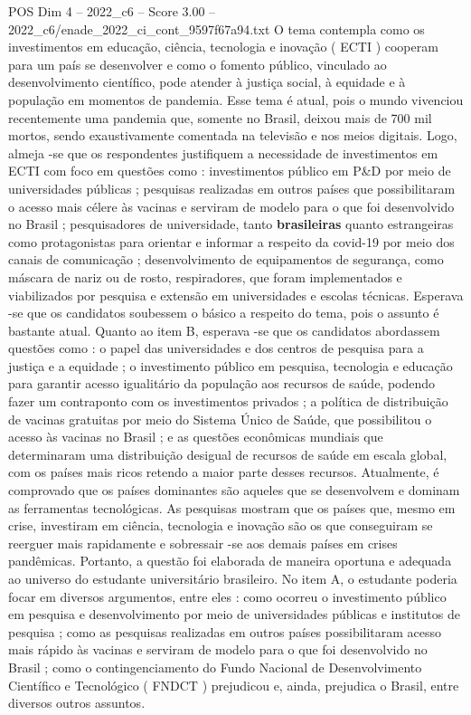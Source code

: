 \begin{textsample}{POS Dim 4 – 2022\_c6 – Score 3.00 – 2022\_c6/enade\_2022\_ci\_cont\_9597f67a94.txt}
O tema contempla como os investimentos em educação, ciência, tecnologia e inovação ( ECTI ) cooperam para um país se desenvolver e como o fomento público, vinculado ao desenvolvimento científico, pode atender à justiça social, à equidade e à população em momentos de pandemia.
Esse tema é atual, pois o mundo vivenciou recentemente uma pandemia que, somente no Brasil, deixou mais de 700 mil mortos, sendo exaustivamente comentada na televisão e nos meios digitais.
Logo, almeja -se que os respondentes justifiquem a necessidade de investimentos em ECTI com foco em questões como : investimentos público em P\&D por meio de universidades públicas ; pesquisas realizadas em outros países que possibilitaram o acesso mais célere às vacinas e serviram de modelo para o que foi desenvolvido no Brasil ; pesquisadores de universidade, tanto \textbf{brasileiras} quanto estrangeiras como protagonistas para orientar e informar a respeito da covid-19 por meio dos canais de comunicação ; desenvolvimento de equipamentos de segurança, como máscara de nariz ou de rosto, respiradores, que foram implementados e viabilizados por pesquisa e extensão em universidades e escolas técnicas.
Esperava -se que os candidatos soubessem o básico a respeito do tema, pois o assunto é bastante atual.
Quanto ao item B, esperava -se que os candidatos abordassem questões como : o papel das universidades e dos centros de pesquisa para a justiça e a equidade ; o investimento público em pesquisa, tecnologia e educação para garantir acesso igualitário da população aos recursos de saúde, podendo fazer um contraponto com os investimentos privados ; a política de distribuição de vacinas gratuitas por meio do Sistema Único de Saúde, que possibilitou o acesso às vacinas no Brasil ; e as questões econômicas mundiais que determinaram uma distribuição desigual de recursos de saúde em escala global, com os países mais ricos retendo a maior parte desses recursos.
Atualmente, é comprovado que os países dominantes são aqueles que se desenvolvem e dominam as ferramentas tecnológicas.
As pesquisas mostram que os países que, mesmo em crise, investiram em ciência, tecnologia e inovação são os que conseguiram se reerguer mais rapidamente e sobressair -se aos demais países em crises pandêmicas.
Portanto, a questão foi elaborada de maneira oportuna e adequada ao universo do estudante universitário brasileiro.
No item A, o estudante poderia focar em diversos argumentos, entre eles : como ocorreu o investimento público em pesquisa e desenvolvimento por meio de universidades públicas e institutos de pesquisa ; como as pesquisas realizadas em outros países possibilitaram acesso mais rápido às vacinas e serviram de modelo para o que foi desenvolvido no Brasil ; como o contingenciamento do Fundo Nacional de Desenvolvimento Científico e Tecnológico ( FNDCT ) prejudicou e, ainda, prejudica o Brasil, entre diversos outros assuntos.

\end{textsample}
